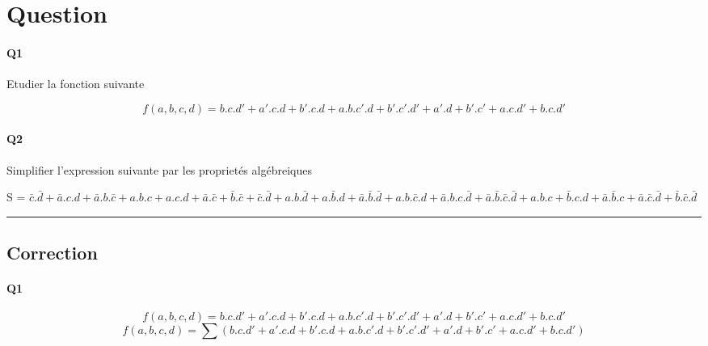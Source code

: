 
\section{Question}


\paragraph{Q1}

Etudier la fonction suivante

$$f(a,b,c,d)=  b.c.d' + a'.c.d + b'.c.d + a.b.c'.d + b'.c'.d'  +  a'.d + b'.c' + a.c.d' + b.c.d' $$


\paragraph{Q2}

Simplifier l'expression suivante par les proprietés algébreiques 

S = $ \bar c.\bar d + \bar a.c.d + \bar a.b.\bar c  +  a.b.c + a.c.d + \bar a.\bar c + \bar b.\bar c + \bar c.\bar d + a.b.\bar d + a.\bar b.d + \bar a.\bar b.\bar d  +  a.b.\bar c.d + \bar a.b.c.\bar d + \bar a.\bar b.\bar c.\bar d  +  a.b.c + \bar b.c.d + \bar a.\bar b.c + \bar a.\bar c.\bar d + \bar b.\bar c.\bar d $


\hrule width 1\linewidth
\pagebreak

\subsection{Correction}


\paragraph{Q1}

$$f(a,b,c,d)= b.c.d' + a'.c.d + b'.c.d + a.b.c'.d + b'.c'.d'  +  a'.d + b'.c' + a.c.d' + b.c.d' $$
$$f(a,b,c,d)=\sum(b.c.d' + a'.c.d + b'.c.d + a.b.c'.d + b'.c'.d'  +  a'.d + b'.c' + a.c.d' + b.c.d')$$

